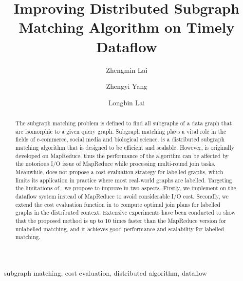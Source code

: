 \documentclass[conference]{IEEEtran}
\begin{document}
\title{Improving Distributed Subgraph Matching Algorithm on Timely Dataflow}

\author[1]{Zhengmin Lai}
\author[2]{Zhengyi Yang}
\author[2]{Longbin Lai}

\maketitle

\begin{abstract}
The subgraph matching problem is defined to find all subgraphs of a data graph that are isomorphic to a given query graph. Subgraph matching plays a vital role in the fields of e-commerce, social media and biological science. \cliquejoin is a distributed subgraph matching algorithm that is designed to be efficient and scalable. However, \cliquejoin is originally developed on MapReduce, thus the performance of the algorithm can be affected by the notorious I/O issue of MapReduce while processing multi-round join tasks. Meanwhile, \cliquejoin does not propose a cost evaluation strategy for labelled graphs, which limits its application in practice where most real-world graphs are labelled. Targeting the limitations of \cliquejoin, we propose \gencliqjoin to improve \cliquejoin in two aspects. Firstly, we implement \gencliqjoin on the \timely dataflow system instead of MapReduce to avoid considerable I/O cost. Secondly, we extend the cost evaluation function in \cliquejoin to compute optimal join plans for labelled graphs in the distributed context. Extensive experiments have been conducted to show that the proposed method is up to 10 times faster than the MapReduce version for unlabelled matching, and it achieves good performance and scalability for labelled matching.
\end{abstract}

\begin{IEEEkeywords}
 subgraph matching, cost evaluation, distributed algorithm, dataflow
\end{IEEEkeywords}















\end{document}
